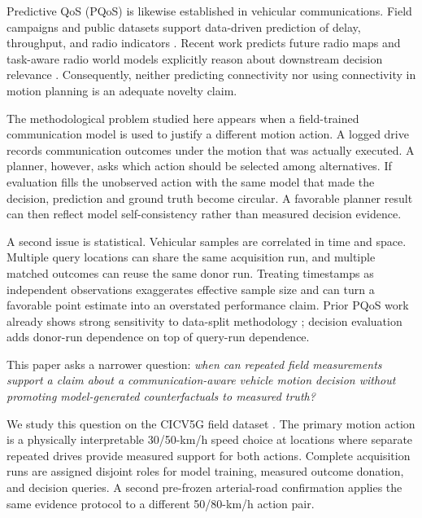 \documentclass[journal]{IEEEtran}
\begin{document}
Predictive QoS (PQoS) is likewise established in vehicular communications. Field campaigns and public datasets support data-driven prediction of delay, throughput, and radio indicators \cite{sliwa2018,hernangomez2023,palaios2023,partani2025,zhang2026}. Recent work predicts future radio maps \cite{cheng2026} and task-aware radio world models explicitly reason about downstream decision relevance \cite{wang2026rmworld}. Consequently, neither predicting connectivity nor using connectivity in motion planning is an adequate novelty claim.

The methodological problem studied here appears when a field-trained communication model is used to justify a different motion action. A logged drive records communication outcomes under the motion that was actually executed. A planner, however, asks which action should be selected among alternatives. If evaluation fills the unobserved action with the same model that made the decision, prediction and ground truth become circular. A favorable planner result can then reflect model self-consistency rather than measured decision evidence.

A second issue is statistical. Vehicular samples are correlated in time and space. Multiple query locations can share the same acquisition run, and multiple matched outcomes can reuse the same donor run. Treating timestamps as independent observations exaggerates effective sample size and can turn a favorable point estimate into an overstated performance claim. Prior PQoS work already shows strong sensitivity to data-split methodology \cite{palaios2023}; decision evaluation adds donor-run dependence on top of query-run dependence.

This paper asks a narrower question: \emph{when can repeated field measurements support a claim about a communication-aware vehicle motion decision without promoting model-generated counterfactuals to measured truth?}

We study this question on the CICV5G field dataset \cite{zhang2026}. The primary motion action is a physically interpretable 30/50-km/h speed choice at locations where separate repeated drives provide measured support for both actions. Complete acquisition runs are assigned disjoint roles for model training, measured outcome donation, and decision queries. A second pre-frozen arterial-road confirmation applies the same evidence protocol to a different 50/80-km/h action pair.
\end{document}
